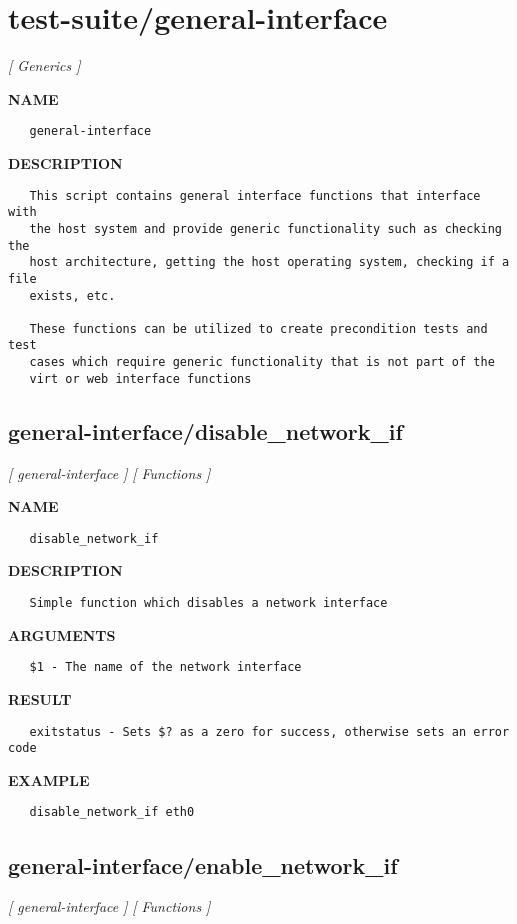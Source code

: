 \section{test-suite/general-interface}
\textsl{[ Generics ]}

\label{ch:robo42}
\label{ch:test_suite_general_interface}
\textbf{NAME}
\begin{verbatim}
   general-interface
\end{verbatim}
\textbf{DESCRIPTION}
\begin{verbatim}
   This script contains general interface functions that interface with 
   the host system and provide generic functionality such as checking the
   host architecture, getting the host operating system, checking if a file
   exists, etc.

   These functions can be utilized to create precondition tests and test 
   cases which require generic functionality that is not part of the
   virt or web interface functions
\end{verbatim}
\newpage
\subsection{general-interface/disable\_network\_if}
\textsl{[ general-interface ]}
\textsl{[ Functions ]}

\label{ch:robo25}
\label{ch:general_interface_disable_network_if}
\textbf{NAME}
\begin{verbatim}
   disable_network_if
\end{verbatim}
\textbf{DESCRIPTION}
\begin{verbatim}
   Simple function which disables a network interface
\end{verbatim}
\textbf{ARGUMENTS}
\begin{verbatim}
   $1 - The name of the network interface
\end{verbatim}
\textbf{RESULT}
\begin{verbatim}
   exitstatus - Sets $? as a zero for success, otherwise sets an error code
\end{verbatim}
\textbf{EXAMPLE}
\begin{verbatim}
   disable_network_if eth0
\end{verbatim}
\newpage
\subsection{general-interface/enable\_network\_if}
\textsl{[ general-interface ]}
\textsl{[ Functions ]}

